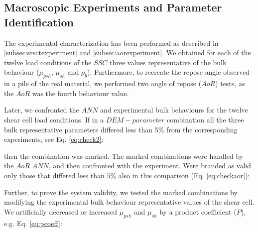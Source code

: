 \subsection{Macroscopic Experiments and Parameter Identification}
\label{subsec:macroscopicexperimentsparameteridentification}
The experimental characterization has been performed as described in
\ref{subsec:srsctexperiment} and \ref{subsec:aorexperiment}. 
We obtained for each of the twelve load conditions of the $SSC$ three values
representative of the bulk behaviour ($\mu_{psh}$, $\mu_{sh}$ and $\rho_b$).
Furthermore, to recreate the repose angle observed in a pile of the real material, 
we performed two angle of repose ($AoR$) tests, as the $AoR$ was the fourth
behaviour value. 

Later, we confronted the $ANN$ and experimental bulk behaviours for the twelve shear cell load conditions. 
If in a $DEM-parameter$ combination all the three bulk representative parameters differed less 
than 5\% from the corresponding experiments, see Eq. \ref{eq:check2}:

then the combination was marked. The marked combinations were handled by the
$AoR$ $ANN$, and then confronted with the experiment.
Were branded as valid only those that differed less than $5\%$ also in this
comparison (Eq. \ref{eq:checkaor}):

Further, to prove the system validity, we tested the marked combinations by
modifying the experimental bulk behaviour representative values of the shear cell. 
We artificially decreased or increased $\mu_{psh}$ and $\mu_{sh}$ by a product
coefficient ($P$), e.g. Eq. \ref{eq:pcoeff}:
